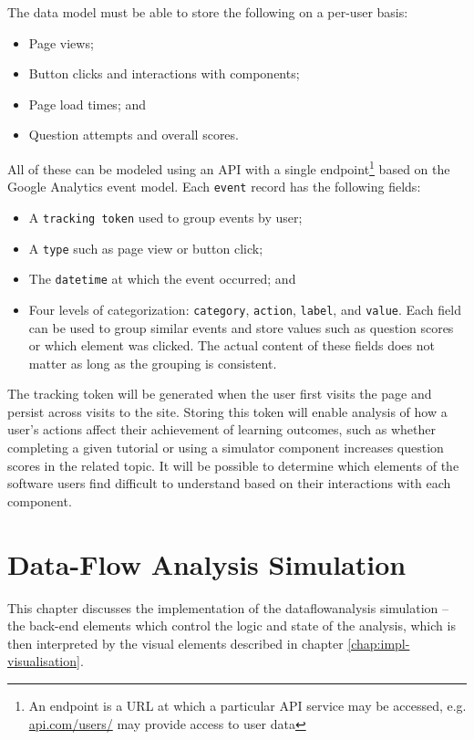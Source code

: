 \documentclass[bsc,twoside,singlespacing,parskip,logo,notimes,normalheadings]{infthesis}
\begin{document}
    The data model must be able to store the following on a per-user
    basis:

    \begin{itemize}
    \item Page views;
    \item Button clicks and interactions with components;
    \item Page load times; and
    \item Question attempts and overall scores.
    \end{itemize}

    All of these can be modeled using an API with a single
    endpoint\footnote{An endpoint is a URL at which a particular API
      service may be accessed, e.g. \url{api.com/users/} may provide
      access to user data} based on the Google Analytics event
    model. Each {\tt event} record has the following fields:

    \begin{itemize}
    \item A {\tt tracking token} used to group events by user;
    \item A {\tt type} such as page view or button click;
    \item The {\tt datetime} at which the event occurred; and
    \item Four levels of categorization: {\tt category}, {\tt action},
      {\tt label}, and {\tt value}. Each field can be used to group
      similar events and store values such as question scores or which
      element was clicked. The actual content of these fields does not
      matter as long as the grouping is consistent.
    \end{itemize}

    The tracking token will be generated when the user first visits
    the page and persist across visits to the site. Storing this token
    will enable analysis of how a user's actions affect their
    achievement of learning outcomes, such as whether completing a
    given tutorial or using a simulator component increases question
    scores in the related topic. It will be possible to determine
    which elements of the software users find difficult to understand
    based on their interactions with each component.
    

\chapter{Data-Flow Analysis Simulation}\label{chap:impl-simulation}
This chapter discusses the implementation of the
\gls{dataflowanalysis} simulation -- the back-end elements which
control the logic and state of the analysis, which is then interpreted
by the visual elements described in chapter
\ref{chap:impl-visualisation}.
\end{document}
